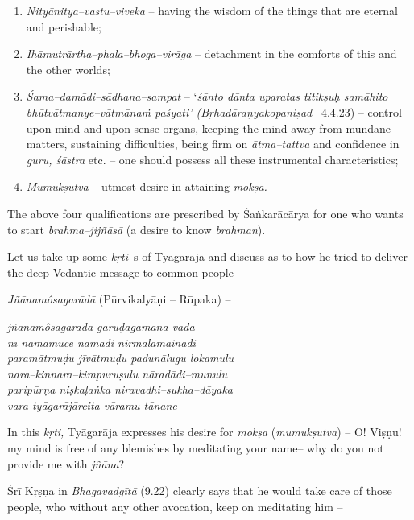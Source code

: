 \begin{enumerate}
\itemsep=0pt
\item \textit{Nityānitya–vastu–viveka} – having the wisdom of the things that are eternal and perishable;
 
\item \textit{Ihāmutrārtha–phala–bhoga–virāga} – detachment in the comforts of this and the other worlds;
 
\item \textit{Śama–damādi–sādhana–sampat} – ‘\textit{śānto dānta uparatas titikṣuḥ samāhito bhūtvātmanye–vātmānaṁ paśyati’ (Bṛhadāraṇyakopaniṣad}  4.4.23) – control upon mind and upon sense organs, keeping the mind away from mundane matters, sustaining difficulties, being firm on \textit{ātma–tattva} and confidence in \textit{guru, śāstra} etc. – one should possess all these instrumental characteristics;
 
\item \textit{Mumukṣutva} – utmost desire in attaining \textit{mokṣa.}
 
\end{enumerate}

The above four qualifications are prescribed by Śaṅkarācārya for one who wants to start \textit{brahma–jijñāsā} (a desire to know \textit{brahman}).

Let us take up some \textit{kṛti}–s of Tyāgarāja and discuss as to how he tried to deliver the deep Vedāntic message to common people –

\textit{Jñānamôsagarādā} (Pūrvikalyāṇi – Rūpaka) –

\begin{myquote}
\textit{jñānamôsagarādā garuḍagamana vādā} \\\textit{nī nāmamuce nāmadi nirmalamainadi} \\\textit{paramātmuḍu jīvātmuḍu padunālugu lokamulu}\\\textit{nara–kinnara–kimpuruṣulu nāradādi–munulu}\\\textit{paripūrṇa niṣkaḷaṅka niravadhi–sukha–dāyaka}\\\textit{vara tyāgarājārcita vāramu tānane}
\end{myquote}

In this \textit{kṛti,} Tyāgarāja expresses his desire for \textit{mokṣa} (\textit{mumukṣutva}) – O! Viṣṇu! my mind is free of any blemishes by meditating your name– why do you not provide me with \textit{jñāna}?

Śrī Kṛṣṇa in \textit{Bhagavadgītā} (9.22) clearly says that he would take care of those people, who without any other avocation, keep on meditating him –

